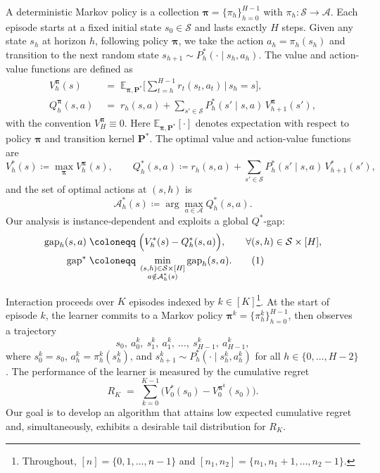 \documentclass[11pt]{article}
\newcommand{\pii}{\boldsymbol{\pi}}
\newcommand{\pp}{\boldsymbol{P}}
\newcommand{\E} {\mathbb{E}}
\newcommand\numberthis{\addtocounter{equation}{1}\tag{\theequation}}
\newcommand{\gap}{\mathrm{gap}}
\newcommand{\gapstar}{\mathrm{gap}^*}
\begin{document}
A deterministic Markov policy is a collection $\pii=\{\pi_h\}_{h=0}^{H-1}$ with $\pi_h:\mathcal S\to\mathcal A$. Each episode starts at a fixed initial state $s_0\in\mathcal S$ and lasts exactly $H$ steps. Given any state $s_h$ at horizon $h$, following policy $\pii$, we take the action $a_h=\pi_h(s_h)$ and transition to the next random state $s_{h+1}\sim P_h^*(\cdot\mid s_h,a_h)$. The value and action-value functions are defined as
\begin{align*}
V_{h}^{\pii}(s)&\;=\;\mathbb E_{\pii,\pp^*}\!\Big[\sum_{t=h}^{H-1} r_t (s_t, a_t)\,\Big|\,s_h=s\Big],\\
Q_{h}^{\pii}(s,a)
&\;=\; r_h(s,a) +\sum_{s'\in\mathcal S} P_h^*(s'\mid s,a)\,V_{h+1}^{\pii}(s'),
\end{align*}
with the convention $V_H^{\pii}\equiv 0$. Here $\E_{\pii,\pp^*}[\cdot]$ denotes expectation with respect to policy $\pii$ and transition kernel $\pp^*$. The optimal value and action-value functions are
\[
V_h^*(s)\coloneqq\max_{\pii}V_h^{\pii}(s),
\qquad
Q_h^*(s,a)\coloneqq r_h(s,a)+\sum_{s'\in\mathcal S} P_h^*(s'\mid s,a)\,V_{h+1}^*(s'),
\]
and the set of optimal actions at $(s,h)$ is
\[
\mathcal A_h^*(s)\coloneqq\arg\max_{a\in\mathcal A} Q_h^*(s,a).
\]
Our analysis is instance-dependent and exploits a global $Q^*$-gap:
\begin{align*}
\gap_h(s,a) \;&\coloneqq\; \Big(V_h^*(s)-Q_h^*(s,a)\Big),\qquad \forall (s,h)\in\mathcal S\times[H], \\
\gapstar \;&\coloneqq\; \min_{\substack{(s,h)\in\mathcal S\times[H]\\ a\notin \mathcal A_h^*(s)}} \gap_h(s,a) .\numberthis\label{eq:gap}
\end{align*}

Interaction proceeds over $K$ episodes indexed by $k\in[K]$\footnote{Throughout, $[n]=\{0,1,\dots,n-1\}$ and $[n_1,n_2] = \{n_1,n_1+1,\dots,n_2-1\}$.}. At the start of episode $k$, the learner commits to a Markov policy $\pii^k=\{\pi_h^k\}_{h=0}^{H-1}$, then observes a trajectory
\[
s_0,\ a_0^k,\ s_1^k,\ a_1^k,\ \dots,\ s_{H-1}^k,\ a_{H-1}^k,
\]
where $s_0^k=s_0$, $a_h^k=\pi_h^k(s_h^k)$, and $s_{h+1}^k\sim P_h^*(\cdot\mid s_h^k,a_h^k)$ for all $h\in\{0,\dots,H-2\}$. The performance of the learner is measured by the cumulative regret
\begin{equation}
R_K \;=\; \sum_{k=0}^{K-1}\Big(V_0^*(s_0)-V_0^{\pii^k}(s_0)\Big).\nonumber
\end{equation}
Our goal is to develop an algorithm that attains low expected cumulative regret and, simultaneously, exhibits a desirable tail distribution for $R_K$.
\end{document}
